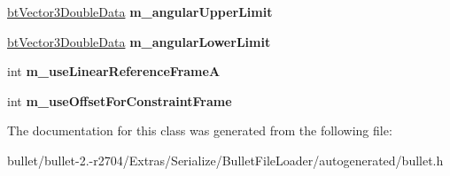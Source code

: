 \begin{DoxyCompactItemize}
\item 
\hypertarget{class_bullet_1_1bt_generic6_dof_constraint_double_data2_af14245705127935436705d1a5310ce06}{\hyperlink{class_bullet_1_1bt_vector3_double_data}{bt\+Vector3\+Double\+Data} {\bfseries m\+\_\+angular\+Upper\+Limit}}\label{class_bullet_1_1bt_generic6_dof_constraint_double_data2_af14245705127935436705d1a5310ce06}

\item 
\hypertarget{class_bullet_1_1bt_generic6_dof_constraint_double_data2_af694720199eb70dc06b3901dfc202fce}{\hyperlink{class_bullet_1_1bt_vector3_double_data}{bt\+Vector3\+Double\+Data} {\bfseries m\+\_\+angular\+Lower\+Limit}}\label{class_bullet_1_1bt_generic6_dof_constraint_double_data2_af694720199eb70dc06b3901dfc202fce}

\item 
\hypertarget{class_bullet_1_1bt_generic6_dof_constraint_double_data2_a4bd8a0c64fcb187c77ea00b44ca1058c}{int {\bfseries m\+\_\+use\+Linear\+Reference\+Frame\+A}}\label{class_bullet_1_1bt_generic6_dof_constraint_double_data2_a4bd8a0c64fcb187c77ea00b44ca1058c}

\item 
\hypertarget{class_bullet_1_1bt_generic6_dof_constraint_double_data2_a1d58a8d26b908ad458a8f21174786027}{int {\bfseries m\+\_\+use\+Offset\+For\+Constraint\+Frame}}\label{class_bullet_1_1bt_generic6_dof_constraint_double_data2_a1d58a8d26b908ad458a8f21174786027}

\end{DoxyCompactItemize}


The documentation for this class was generated from the following file\+:\begin{DoxyCompactItemize}
\item 
bullet/bullet-\/2.-\/r2704/\+Extras/\+Serialize/\+Bullet\+File\+Loader/autogenerated/bullet.\+h\end{DoxyCompactItemize}
